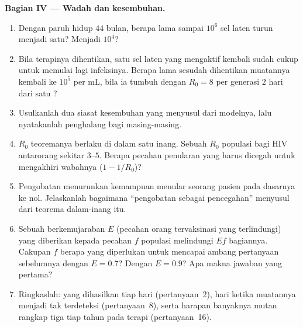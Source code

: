 \begin{problem}
\medskip
\noindent\textbf{Bagian IV --- Wadah dan kesembuhan.}
\begin{enumerate}[resume]
  \item Dengan paruh hidup $44$ bulan, berapa lama sampai $10^{6}$
        sel laten turun menjadi satu? Menjadi $10^{4}$?
  \item Bila terapinya dihentikan, satu sel laten yang mengaktif kembali sudah
        cukup untuk memulai lagi infeksinya. Berapa lama sesudah dihentikan
        muatannya kembali ke $10^{5}$ per mL, bila ia tumbuh dengan
        $R_{0} = 8$ per generasi $2$ hari dari satu ?
  \item Usulkanlah dua siasat kesembuhan yang menyusul dari modelnya,
        lalu nyatakanlah penghalang bagi masing-masing.
  \item $R_{0}$ teoremanya berlaku di dalam satu inang. Sebuah $R_{0}$
        populasi bagi HIV antarorang sekitar $3$--$5$. Berapa pecahan
        penularan yang harus dicegah untuk mengakhiri wabahnya
        ($1 - 1/R_{0}$)?
  \item Pengobatan menurunkan kemampuan menular seorang pasien pada dasarnya
        ke nol. Jelaskanlah bagaimana ``pengobatan sebagai pencegahan''
        menyusul dari teorema dalam-inang itu.
  \item Sebuah  berkemujaraban $E$ (pecahan orang tervaksinasi yang
        terlindungi) yang diberikan kepada pecahan $f$ populasi melindungi
        $Ef$ bagiannya. Cakupan $f$ berapa yang diperlukan untuk mencapai
        ambang pertanyaan sebelumnya dengan $E = 0.7$? Dengan $E = 0.9$? Apa
        makna jawaban yang pertama?
  \item Ringkaslah:  yang dihasilkan tiap hari (pertanyaan~2), hari
        ketika muatannya menjadi tak terdeteksi (pertanyaan~8), serta harapan
        banyaknya mutan rangkap tiga tiap tahun pada terapi (pertanyaan~16).
\end{enumerate}
\end{problem}
